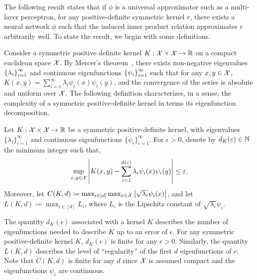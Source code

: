 
The following result states that if $\phi$ is a universal approximator such as a multi-layer perceptron, for any positive-definite symmetric kernel $r$, there exists a neural network $\phi$ such that the induced inner product relation approximates $r$ arbitrarily well. To state the result, we begin with some definitions.

Consider a symmetric positive definite kernel $K: {\mathcal{X}} \times {\mathcal{X}} \to \mathbb{R}$ on a compact euclidean space ${\mathcal{X}}$. By Mercer's theorem~\parencite{mercerFunctionsPositive1909, sunMercerTheorem2005, micchelliUniversalKernels2006}, there exists non-negative eigenvalues $\left\{\lambda_i\right\}_{i=1}^{\infty}$ and continuous eigenfunctions $\left\{\psi_i\right\}_{i=1}^{\infty}$ such that for any $x,y \in {\mathcal{X}}$, $K(x, y) = \sum_{i=1}^\infty \lambda_i \psi_i(x) \psi_i(y)$, and the convergence of the series is absolute and uniform over ${\mathcal{X}}$. The following definition characterizes, in a sense, the complexity of a symmetric positive-definite kernel in terms its eigenfunction decomposition.

\begin{definition}\label{def:sym_pd_ker_specturm_decay}
	Let $K: {\mathcal{X}} \times {\mathcal{X}} \to \mathbb{R}$ be a symmetric positive-definite kernel, with eigenvalues $\{\lambda_i\}_{i=1}^{\infty}$ and continuous eigenfunctions $\{\psi_i\}_{i=1}^{\infty}$. For $\epsilon > 0$, denote by $d_K(\varepsilon) \in \mathbb{N}$ the minimum integer such that,
	\begin{equation*}
		\sup_{x, y \in \calX} \abs{K(x, y) - \sum_{i=1}^{d(\epsilon)} \lambda_i \psi_i(x) \psi_i(y)} \leq \epsilon.
	\end{equation*}
	Moreover, let $C(K, d) \coloneq \max_{i \in [d]} \max_{x \in {\mathcal{X}}} \left\lvert\sqrt{\lambda_i} \psi_i(x)\right\rvert$, and let $L(K, d) \coloneq \max_{i \in [d]} L_i$, where $L_i$ is the Lipschitz constant of $\sqrt{\lambda_i} \psi_i$.
\end{definition}

The quantity $d_K(\epsilon)$ associated with a kernel $K$ describes the number of eigenfunctions needed to describe $K$ up to an error of $\epsilon$. For any symmetric positive-definite kernel $K$, $d_K(\epsilon)$ is finite for any $\epsilon > 0$. Similarly, the quantity $L(K, d)$ describes the level of ``regularity'' of the first $d$ eigenfunctions of $r$. Note that $C(K, d)$ is finite for any $d$ since ${\mathcal{X}}$ is assumed compact and the eigenfunctions $\psi_i$ are continuous. %

